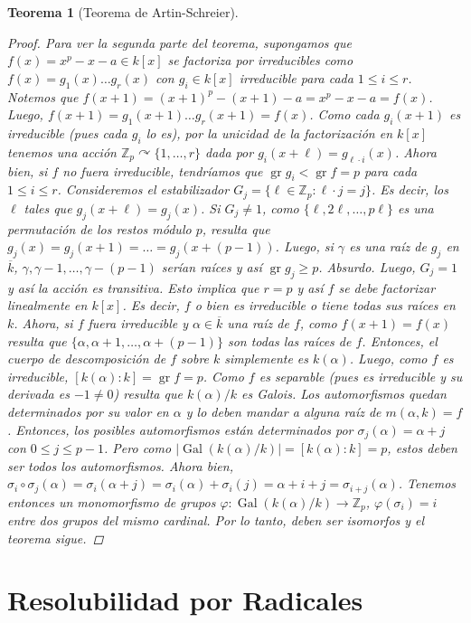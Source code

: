 \documentclass[12pt]{book}
\newtheorem{teo}{Teorema}[section]
\theoremstyle{definition}
\newcommand{\ZZ}{\mathbb{Z}}      %
\DeclareMathOperator{\gr}{gr}
\DeclareMathOperator{\Gal}{Gal}
\def\acts{\curvearrowright}
\begin{document}
\begin{teo}[Teorema de Artin-Schreier]
\begin{proof}
Para ver la segunda parte del teorema, supongamos que $f(x)=x^p - x - a\in k[x]$ se factoriza por irreducibles como $f(x)=g_1(x)\ldots g_r(x)$ con $g_i\in k[x]$ irreducible para cada $1\leq i\leq r$. Notemos que $f(x+1) = (x+1)^p - (x+1) - a = x^p - x - a = f(x)$. Luego, $f(x+1) = g_1(x+1)\ldots g_r(x+1) = f(x)$. Como cada $g_i(x+1)$ es irreducible (pues cada $g_i$ lo es), por la unicidad de la factorización en $k[x]$ tenemos una acción $\ZZ_p\acts \{1,\ldots , r\}$ dada por $g_i(x+\ell) = g_{\ell\cdot i}(x)$. Ahora bien, si $f$ no fuera irreducible, tendríamos que $\gr g_i < \gr f = p$ para cada $1\leq i\leq r$. Consideremos el estabilizador $G_j = \{\ell\in\ZZ_p : \ell\cdot j = j\}$. Es decir, los $\ell$ tales que $g_j(x+\ell) = g_j(x)$. Si $G_j\neq 1$, como $\{\ell,2\ell,\ldots , p\ell\}$ es una permutación de los restos módulo $p$, resulta que $g_j(x)=g_j(x+1)=\ldots = g_j(x + (p-1))$. Luego, si $\gamma$ es una raíz de $g_j$ en $\overline{k}$, $\gamma, \gamma-1,\ldots , \gamma-(p-1)$ serían raíces y así $\gr g_j\geq p$. Absurdo. Luego, $G_j=1$ y así la acción es transitiva. Esto implica que $r=p$ y así $f$ se debe factorizar linealmente en $k[x]$. Es decir, $f$ o bien es irreducible o tiene todas sus raíces en $k$. Ahora, si $f$ fuera irreducible y $\alpha\in\overline{k}$ una raíz de $f$, como $f(x+1)=f(x)$ resulta que $\{\alpha,\alpha+1,\ldots , \alpha+(p-1)\}$ son todas las raíces de $f$. Entonces, el cuerpo de descomposición de $f$ sobre $k$ simplemente es $k(\alpha)$. Luego, como $f$ es irreducible, $[k(\alpha):k]=\gr f = p$. Como $f$ es separable (pues es irreducible y su derivada es $-1\neq 0$) resulta que $k(\alpha)/k$ es Galois. Los automorfismos quedan determinados por su valor en $\alpha$ y lo deben mandar a alguna raíz de $m(\alpha,k)=f$. Entonces, los posibles automorfismos están determinados por $\sigma_j(\alpha)=\alpha+j$ con $0\leq j\leq p-1$. Pero como $|\Gal(k(\alpha)/k)| = [k(\alpha):k]=p$, estos deben ser todos los automorfismos. Ahora bien, $\sigma_i\circ\sigma_j(\alpha) = \sigma_i(\alpha+j)=\sigma_i(\alpha)+\sigma_i(j) = \alpha + i+j = \sigma_{i+j}(\alpha)$. Tenemos entonces un monomorfismo de grupos $\varphi:\Gal(k(\alpha)/k)\to \ZZ_p$, $\varphi(\sigma_i)=i$ entre dos grupos del mismo cardinal. Por lo tanto, deben ser isomorfos y el teorema sigue.
\end{proof}
\end{teo}

\section{Resolubilidad por Radicales}
\end{document}
